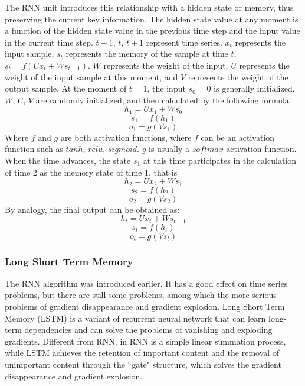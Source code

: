 \documentclass{article}
\begin{document}
The RNN unit introduces this relationship with a hidden state or memory, thus preserving the current key information. The hidden state value at any moment is a function of the hidden state value in the previous time step and the input value in the current time step. $t-1$, $t$, $t+1$ represent time series. $x_{t}$ represents the input sample, $s_{t}$ represents the memory of the sample at time $t$, $s_{t}=f\left(U x_{t}+W s_{t-1}\right)$. $W$ represents the weight of the input, $U$ represents the weight of the input sample at this moment, and $V$ represents the weight of the output sample.
At the moment of $t=1$, the input $s_{0}=0$ is generally initialized, $W$, $U$, $V$ are randomly initialized, and then calculated by the following formula:
\begin{equation}
h_{1}=U x_{1}+W s_{0}
\end{equation}
\begin{equation}
s_{1}=f\left(h_{1}\right)
\end{equation}
\begin{equation}
o_{1}=g\left(V s_{1}\right)
\end{equation}
Where $f$ and $g$ are both activation functions, where $f$ can be an activation function such as $tanh$, $relu$, $sigmoid$. $g$ is usually a $softmax$ activation function. When the time advances, the state $s_{1}$ at this time participates in the calculation of time 2 as the memory state of time 1, that is
\begin{equation}
h_{2}=U x_{2}+W s_{1}
\end{equation}
\begin{equation}
s_{2}=f\left(h_{2}\right)
\end{equation}
\begin{equation}
o_{2}=g\left(V s_{2}\right)
\end{equation}
By analogy, the final output can be obtained as:
\begin{equation}
h_{t}=U x_{t}+W s_{t-1}
\end{equation}
\begin{equation}
s_{t}=f\left(h_{t}\right)
\end{equation}
\begin{equation}
o_{t}=g\left(V s_{t}\right)
\end{equation}

\subsubsection{Long Short Term Memory}
The RNN algorithm was introduced earlier. It has a good effect on time series problems, but there are still some problems, among which the more serious problems of gradient disappearance and gradient explosion. Long Short Term Memory (LSTM) is a variant of recurrent neural network that can learn long-term dependencies and can solve the problems of vanishing and exploding gradients. Different from RNN, in RNN is a simple linear summation process, while LSTM achieves the retention of important content and the removal of unimportant content through the ``gate" structure, which solves the gradient disappearance and gradient explosion.
\end{document}
